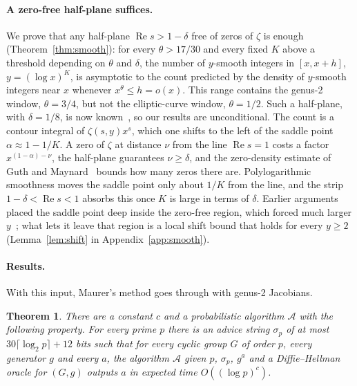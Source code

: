 \documentclass[11pt]{article}
\newtheorem{theorem}{Theorem}
\theoremstyle{remark}
\begin{document}
\paragraph{A zero-free half-plane suffices.}
We prove that any half-plane $\operatorname{Re}s>1-\delta$ free of zeros of $\zeta$ is enough
(Theorem~\ref{thm:smooth}): for every $\theta>17/30$ and every fixed $K$ above a threshold depending on
$\theta$ and $\delta$, the number of $y$-smooth integers in $[x,x+h]$, $y=(\log x)^K$, is asymptotic to the
count predicted by the density of $y$-smooth integers near $x$ whenever $x^\theta\le h=o(x)$. This range
contains the genus-2 window, $\theta=3/4$, but not the elliptic-curve window, $\theta=1/2$. Such a
half-plane, with $\delta=1/8$, is now known~\cite{OAI26}, so our results are unconditional. The count is a
contour integral of $\zeta(s,y)x^s$, which one shifts to the left of the saddle point $\alpha\approx1-1/K$. A
zero of $\zeta$ at distance $\nu$ from the line $\operatorname{Re}s=1$ costs a factor $x^{(1-\alpha)-\nu}$,
the half-plane guarantees $\nu\ge\delta$, and the zero-density estimate of Guth and Maynard~\cite{GM24}
bounds how many zeros there are. Polylogarithmic smoothness moves the saddle point only about $1/K$ from the
line, and the strip $1-\delta<\operatorname{Re}s<1$ absorbs this once $K$ is large in terms of $\delta$.
Earlier arguments placed the saddle point deep inside the zero-free region, which forced much larger
$y$~\cite{Zha26}; what lets it leave that region is a local shift bound that holds for every $y\ge2$
(Lemma~\ref{lem:shift} in Appendix~\ref{app:smooth}).

\paragraph{Results.}
With this input, Maurer's method goes through with genus-2 Jacobians.

\begin{theorem}\label{thm:main}
There are a constant $c$ and a probabilistic algorithm $\mathcal A$ with the following property. For every
prime $p$ there is an advice string $\sigma_p$ of at most $30\lceil\log_2p\rceil+12$ bits such that for every
cyclic group $G$ of order $p$, every generator $g$ and every $a$, the algorithm $\mathcal A$ given $p$,
$\sigma_p$, $g^a$ and a Diffie--Hellman oracle for $(G,g)$ outputs $a$ in expected time $O((\log p)^c)$.
\end{theorem}
\end{document}
